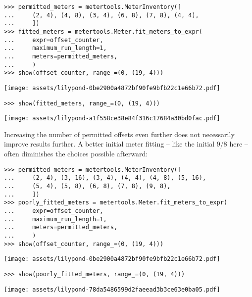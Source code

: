 \begin{singlespacing}
\vspace{-0.5\baselineskip}
\begin{lstlisting}
>>> permitted_meters = metertools.MeterInventory([
...     (2, 4), (4, 8), (3, 4), (6, 8), (7, 8), (4, 4),
...     ])
>>> fitted_meters = metertools.Meter.fit_meters_to_expr(
...     expr=offset_counter,
...     maximum_run_length=1,
...     meters=permitted_meters,
...     )
>>> show(offset_counter, range_=(0, (19, 4)))
\end{lstlisting}
\noindent\texttt{[image: assets/lilypond-0be2900a4872bf90fe9bfb22c1e66b72.pdf]}
\begin{lstlisting}
>>> show(fitted_meters, range_=(0, (19, 4)))
\end{lstlisting}
\noindent\texttt{[image: assets/lilypond-a1f558ce38e84f316c17684a30bd0fac.pdf]}
\end{singlespacing}

\noindent Increasing the number of permitted offsets even further does not
necessarily improve results further. A better initial meter fitting -- like the
initial 9/8 here -- often diminishes the choices possible afterward:

\begin{comment}
<abjad>
permitted_meters = metertools.MeterInventory([
    (2, 4), (3, 16), (3, 4), (4, 4), (4, 8), (5, 16),
    (5, 4), (5, 8), (6, 8), (7, 8), (9, 8),
    ])
poorly_fitted_meters = metertools.Meter.fit_meters_to_expr(
    expr=offset_counter,
    maximum_run_length=1,
    meters=permitted_meters,
    )
show(offset_counter, range_=(0, (19, 4)))
show(poorly_fitted_meters, range_=(0, (19, 4)))
</abjad>
\end{comment}

\begin{singlespacing}
\vspace{-0.5\baselineskip}
\begin{lstlisting}
>>> permitted_meters = metertools.MeterInventory([
...     (2, 4), (3, 16), (3, 4), (4, 4), (4, 8), (5, 16),
...     (5, 4), (5, 8), (6, 8), (7, 8), (9, 8),
...     ])
>>> poorly_fitted_meters = metertools.Meter.fit_meters_to_expr(
...     expr=offset_counter,
...     maximum_run_length=1,
...     meters=permitted_meters,
...     )
>>> show(offset_counter, range_=(0, (19, 4)))
\end{lstlisting}
\noindent\texttt{[image: assets/lilypond-0be2900a4872bf90fe9bfb22c1e66b72.pdf]}
\begin{lstlisting}
>>> show(poorly_fitted_meters, range_=(0, (19, 4)))
\end{lstlisting}
\noindent\texttt{[image: assets/lilypond-78da5486599d2faeead3b3ce63e0ba05.pdf]}
\end{singlespacing}

